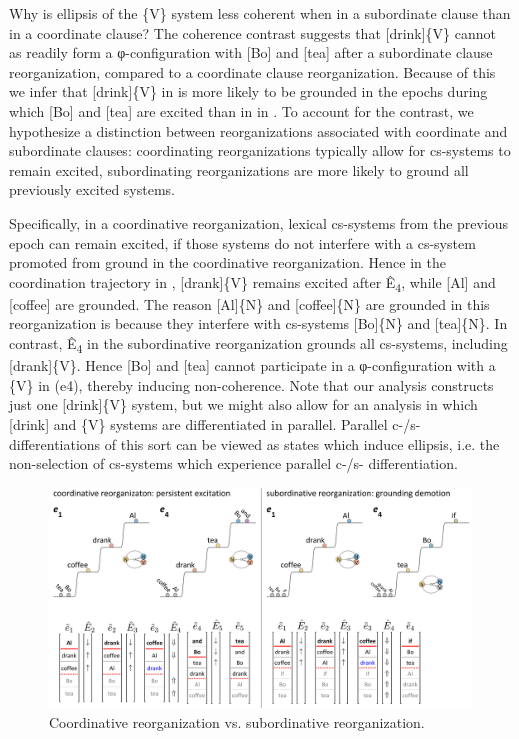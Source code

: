   Why is ellipsis of the \{V\} system less coherent when in a subordinate clause than in a coordinate clause? The coherence contrast suggests that [drink]\{V\} cannot as readily form a φ-configuration with [Bo] and [tea] after a subordinate clause reorganization, compared to a coordinate clause reorganization. Because of this we infer that [drink]\{V\} in  is more likely to be grounded in the epochs during which [Bo] and [tea] are excited than in in . To account for the contrast, we hypothesize a distinction between reorganizations associated with coordinate and subordinate clauses: coordinating reorganizations typically allow for cs-systems to remain excited, subordinating reorganizations are more likely to ground all previously excited systems. 

  Specifically, in a coordinative reorganization, lexical cs-systems from the previous epoch can remain excited, if those systems do not interfere with a cs-system promoted from ground in the coordinative reorganization. Hence in the coordination trajectory in {}, [drank]\{V\} remains excited after Ê\textsubscript{4}, while [Al] and [coffee] are grounded. The reason [Al]\{N\} and [coffee]\{N\} are grounded in this reorganization is because they interfere with cs-systems [Bo]\{N\} and [tea]\{N\}. In contrast, Ê\textsubscript{4} in the subordinative reorganization grounds all cs-systems, including [drank]\{V\}. Hence [Bo] and [tea] cannot participate in a φ-configuration with a \{V\} in (e4), thereby inducing non-coherence. Note that our analysis constructs just one [drink]\{V\} system, but we might also allow for an analysis in which [drink] and \{V\} systems are differentiated in parallel. Parallel c-/s- differentiations of this sort can be viewed as states which induce ellipsis, i.e. the non-selection of cs-systems which experience parallel c-/s- differentiation.

  
\begin{figure}
\includegraphics[width=\textwidth]{figures/Tilsen-img146.png}
\caption{Coordinative reorganization vs. subordinative reorganization.}
\label{fig:7:2}
\end{figure}
 

